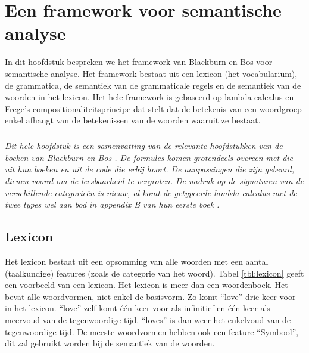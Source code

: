 \chapter{Een framework voor semantische analyse}
\label{ch:framework}
In dit hoofdstuk bespreken we het framework van Blackburn en Bos \cite{Blackburn2005, Blackburn2006} voor semantische analyse. Het framework bestaat uit een lexicon (het vocabularium), de grammatica, de semantiek van de grammaticale regels en de semantiek van de woorden in het lexicon. Het hele framework is gebaseerd op lambda-calcalus en Frege's compositionaliteitsprincipe dat stelt dat de betekenis van een woordgroep enkel afhangt van de betekenissen van de woorden waaruit ze bestaat.

\paragraph{} \textit{Dit hele hoofdstuk is een samenvatting van de relevante hoofdstukken van de boeken van Blackburn en Bos \cite{Blackburn2005, Blackburn2006}. De formules komen grotendeels overeen met die uit hun boeken en uit de code die erbij hoort. De aanpassingen die zijn gebeurd, dienen vooral om de leesbaarheid te vergroten. De nadruk op de signaturen van de verschillende categorieën is nieuw, al komt de getypeerde lambda-calcalus met de twee types wel aan bod in appendix B van hun eerste boek \cite{Blackburn2005}.}

\section{Lexicon}
Het lexicon bestaat uit een opsomming van alle woorden met een aantal (taalkundige) features (zoals de categorie van het woord). Tabel \ref{tbl:lexicon} geeft een voorbeeld van een lexicon. Het lexicon is meer dan een woordenboek. Het bevat alle woordvormen, niet enkel de basisvorm. Zo komt ``love'' drie keer voor in het lexicon. ``love'' zelf komt één keer voor als infinitief en één keer als meervoud van de tegenwoordige tijd. ``loves'' is dan weer het enkelvoud van de tegenwoordige tijd. De meeste woordvormen hebben ook een feature ``Symbool'', dit zal gebruikt worden bij de semantiek van de woorden.

